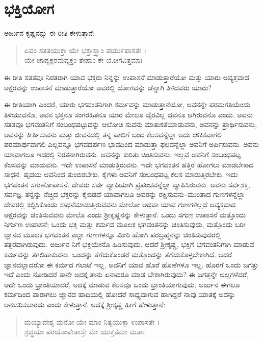 
\chapter{ಭಕ್ತಿಯೋಗ}

ಅರ್ಜುನ ಕೃಷ್ಣನನ್ನು ಈ ರೀತಿ ಕೇಳುತ್ತಾನೆ:

\begin{verse}
ಏವಂ ಸತತಯುಕ್ತಾ ಯೇ ಭಕ್ತಾಸ್ತ್ವಾಂ ಪರ್ಯುಪಾಸತೇ ।\\ಯೇ ಚಾಪ್ಯಕ್ಷರಮವ್ಯಕ್ತಂ ತೇಷಾಂ ಕೇ ಯೋಗವಿತ್ತಮಾಃ 
\end{verse}

{\small ಈ ರೀತಿ ಸತತವೂ ನಿರತರಾಗಿ ಯಾವ ಭಕ್ತರು ನಿನ್ನನ್ನು ಉಪಾಸನೆ ಮಾಡುತ್ತಾರೆಯೋ ಮತ್ತು ಯಾರು ಅವ್ಯಕ್ತವಾದ ಅಕ್ಷರವನ್ನು ಉಪಾಸನೆ ಮಾಡುತ್ತಾರೆಯೋ ಅವರಲ್ಲಿ ಯೋಗವನ್ನು ಚೆನ್ನಾಗಿ ತಿಳಿದವರು ಯಾರು?}

ಈ ರೀತಿಯಾಗಿ ಎಂದರೆ, ಯಾರು ಭಗವಂತನಿಗಾಗಿ ಕರ್ಮವನ್ನು ಮಾಡುತ್ತಾನೆಯೋ, ಅವನನ್ನೇ ಪರಮಗತಿಯೆಂದು ತಿಳಿಯುವನೊ, ಅವನ ಭಕ್ತನೂ ಸಂಗರಹಿತನೂ ಯಾರ ಮೇಲೂ ವೈರವಿಲ್ಲ ದವನೂ ಆಗಿರುವನೊ ಎಂದು. ಅವನು ಸತತವೂ ಭಗವಂತನಿಗೆ ಸಂಬಂಧಪಟ್ಟುದನ್ನು ಆಲೋಚಿ ಸುವನು ಮಾತುಕತೆಯಾಡುವನು, ಅವನನ್ನು ಪ್ರಾರ್ಥಿಸುವನು, ಅವನನ್ನು ಕೀರ್ತಿಸುವನು ಮತ್ತು ಜೀವನದಲ್ಲಿ ತನ್ನ ಪಾಲಿಗೆ ಬಂದ ಕೆಲಸವನ್ನೆಲ್ಲಾ ಅದು ಲೌಕಿಕವಾಗಲಿ ಪರಮಾರ್ಥವಾಗಲಿ ಎಲ್ಲವನ್ನೂ ಭಗವದರ್ಪಣ ಭಾವದಿಂದ ಮಾಡುತ್ತಾ ಫಲವನ್ನೆಲ್ಲಾ ಅವನಿಗೆ ಅರ್ಪಿಸುವನು. ಅವನು ಯಾವಾಗಲೂ ಇದರಲ್ಲಿ ನಿರತನಾಗಿರುವನು. ಅವನನ್ನು ಕುರಿತು ಚಿಂತಿಸುವನು. ಇಲ್ಲವೆ ಅವನಿಗೆ ಸಂಬಂಧಪಟ್ಟ ಕೆಲಸವನ್ನು ಮಾಡುವನು. ಇದೇ ಉಪಾಸನೆ ಮಾಡುತ್ತಿರುವನು. ಇದೇ ಭಗವಂತನ ಹತ್ತಿರ ಹೋಗಲು ಮಾಡಬೇಕಾದ ಸಾಧನೆ. ಹೃದಯ ಅವನಿಂದ ತುಂಬಿರಬೇಕು. ಕೈಗಳು ಅವನಿಗೆ ಸಂಬಂಧಪಟ್ಟ ಕೆಲಸ ಮಾಡುತ್ತಿರಬೇಕು. ಇದು ಭಗವಂತನ ಸಗುಣೋಪಾಸನೆ. ದೇವರು ಸರ್ವ ವ್ಯಾಪಿಯಾಗಿ ಪ್ರಪಂಚವನ್ನೆಲ್ಲಾ ವ್ಯಾಪಿಸಿರುವನು. ಅವನು ಸರ್ವಶಕ್ತ, ಸರ್ವಜ್ಞ, ತನ್ನನ್ನು ನೆಚ್ಚಿದ ಭಕ್ತರನ್ನು ಕೈಬಿಡದೆ ಯಾವಾಗಲೂ ಅವರನ್ನು ರಕ್ಷಿಸುವನು–ಮುಂತಾದ ಗುಣಗಳನ್ನೆಲ್ಲಾ ದೇವರಲ್ಲಿ ಕಲ್ಪಿಸಿಕೊಂಡು ಸಾಧನೆಮಾಡುತ್ತಿರುವವನು ಮೇಲೋ ಅಥವಾ ಯಾವ ಗುಣಗಳಿಲ್ಲದೆ ಅವ್ಯಕ್ತವಾದ ಅಕ್ಷರವನ್ನು ಚಿಂತಿಸುವವನು ಮೇಲೊ ಎಂದು ಶ್ರೀಕೃಷ್ಣನನ್ನು ಕೇಳುತ್ತಾನೆ. ಒಂದು ಸಗುಣ ಉಪಾಸನೆ ಮತ್ತೊಂದು ನಿರ್ಗುಣ ಉಪಾಸನೆ; ಒಂದು ಭಕ್ತಿ ಮತ್ತು ಕರ್ಮದ ಮೂಲಕ ಭಗವಂತನನ್ನು ಚಿಂತಿಸುವುದು, ಮತ್ತೊಂದು ಬರೀ ಜ್ಞಾನದ ಮೂಲಕ ಭಗವಂತನ ಎಲ್ಲಾ ಗುಣಗಳನ್ನೂ ಮೀರಿ ಹೋಗಿ ಪರಬ್ರಹ್ಮನನ್ನು ಚಿಂತಿಸುವುದರಲ್ಲಿ ತತ್ಪರವಾಗಿರುವುದು. ಅರ್ಜುನ ನಿಗೆ ಭಕ್ತಿಯೇನೊ ಹಿಡಿಸುವುದು. ಆದರೆ ಶ್ರೀಕೃಷ್ಣ, ಭಕ್ತಿಗೆ ಭಗವಂತನಿಗಾಗಿ ಮಾಡುವ ಕರ್ಮವನ್ನು ತಗಲಿಹಾಕುವನು. ಒಂದನ್ನು ತೆಗೆದುಕೊಂಡರೆ ಮತ್ತೊಂದನ್ನು ತೆಗೆದುಕೊಳ್ಳಬೇಕಾಗಿದೆ. ಆದರೆ ಜ್ಞಾನದಲ್ಲಾದರೋ ಈ ಕರ್ಮದ ಗಲಾಟೆ ಇಲ್ಲ. ಅವನಿಗೆ ಯಾವ ಹೊರೆ ಹೊಣೆಗಳೂ ಇಲ್ಲ. ಹೊರಗೆ ಒಂದು ಜಗತ್ತು ಇದೆ ಎಂದು ನೋಡಿದರೆ ತಾನೇ ಅದಕ್ಕೆ ತಾನು ಏನಾದರೂ ಮಾಡ ಬೇಕಾಗಿರುವುದು? ಈ ಜಗತ್ತನ್ನೇ ಅಲ್ಲಗಳೆದರೆ, ಅದೇ ಒಂದು ಭ್ರಾಂತಿಯಾದರೆ, ಅದಕ್ಕೆ ಮಾಡುವ ಕೆಲಸವೂ ಒಂದು ಭ್ರಾಂತಿಯಾಗುವುದು. ಅರ್ಜುನ ಈಗಲೂ ಕರ್ಮದಿಂದ ಪಾರಾಗಲು ಜ್ಞಾನದ ಹಾದಿಯಲ್ಲಿ ಹೋದರೆ ಸಾಧ್ಯವಾಗುವ ಹಾಗಿದ್ದರೆ ನಾವು ಯಾತಕ್ಕೆ ಅದನ್ನು ಅನುಸರಿಸಬಾರದು ಎಂದು ಕೇಳುತ್ತಾನೆ. ಅದಕ್ಕೆ ಶ್ರೀಕೃಷ್ಣ ಹೀಗೆ ಹೇಳುತ್ತಾನೆ:

\begin{verse}
ಮಯ್ಯಾವೇಶ್ಯ ಮನೋ ಯೇ ಮಾಂ ನಿತ್ಯಯುಕ್ತಾ ಉಪಾಸತೇ ।\\ಶ್ರದ್ಧಯಾ ಪರಯೋಪೇತಾಸ್ತೇ ಮೇ ಯುಕ್ತತಮಾ ಮತಾಃ 
\end{verse}

